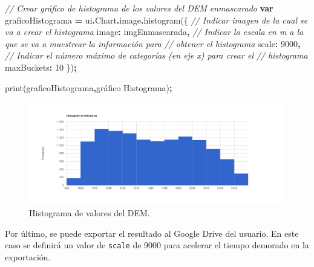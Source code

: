 \documentclass[
  12pt,
  letterpaper,
  twoside]{book}
\newenvironment{Shaded}{\begin{snugshade}}{\end{snugshade}}
\newcommand{\AttributeTok}[1]{\textcolor[rgb]{0.77,0.63,0.00}{#1}}
\newcommand{\CommentTok}[1]{\textcolor[rgb]{0.56,0.35,0.01}{\textit{#1}}}
\newcommand{\DataTypeTok}[1]{\textcolor[rgb]{0.13,0.29,0.53}{#1}}
\newcommand{\DecValTok}[1]{\textcolor[rgb]{0.00,0.00,0.81}{#1}}
\newcommand{\FunctionTok}[1]{\textcolor[rgb]{0.00,0.00,0.00}{#1}}
\newcommand{\KeywordTok}[1]{\textcolor[rgb]{0.13,0.29,0.53}{\textbf{#1}}}
\newcommand{\NormalTok}[1]{#1}
\newcommand{\OperatorTok}[1]{\textcolor[rgb]{0.81,0.36,0.00}{\textbf{#1}}}
\newcommand{\StringTok}[1]{\textcolor[rgb]{0.31,0.60,0.02}{#1}}
\begin{document}
\begin{Shaded}
\begin{Highlighting}[]
\CommentTok{// Crear gráfico de histograma de los valores del DEM enmascarado}
\KeywordTok{var}\NormalTok{ graficoHistograma }\OperatorTok{=}\NormalTok{ ui}\OperatorTok{.}\AttributeTok{Chart}\OperatorTok{.}\AttributeTok{image}\OperatorTok{.}\FunctionTok{histogram}\NormalTok{(\{}
     \CommentTok{// Indicar imagen de la cual se va a crear el histograma  }
  \DataTypeTok{image}\OperatorTok{:}\NormalTok{ imgEnmascarada}\OperatorTok{,}
  \CommentTok{// Indicar la escala en m a la que se va a muestrear la información para  }
  \CommentTok{// obtener el histograma}
  \DataTypeTok{scale}\OperatorTok{:} \DecValTok{9000}\OperatorTok{,}
  \CommentTok{// Indicar el número máximo de categorías (en eje x) para crear el }
  \CommentTok{// histograma}
  \DataTypeTok{maxBuckets}\OperatorTok{:} \DecValTok{10}
\NormalTok{  \})}\OperatorTok{;}

\FunctionTok{print}\NormalTok{(graficoHistograma}\OperatorTok{,}\StringTok{\textquotesingle{}gráfico Histograma\textquotesingle{}}\NormalTok{)}\OperatorTok{;}
\end{Highlighting}
\end{Shaded}

\begin{figure}[btp]

{\centering \includegraphics[width=1\linewidth]{Img/histElevacion} 

}

\caption{Histograma de valores del DEM.}\label{fig:unnamed-chunk-135}
\end{figure}

Por último, se puede exportar el resultado al Google Drive del usuario. En este caso se definirá un valor de \texttt{scale} de 9000 para acelerar el tiempo demorado en la exportación.
\end{document}
